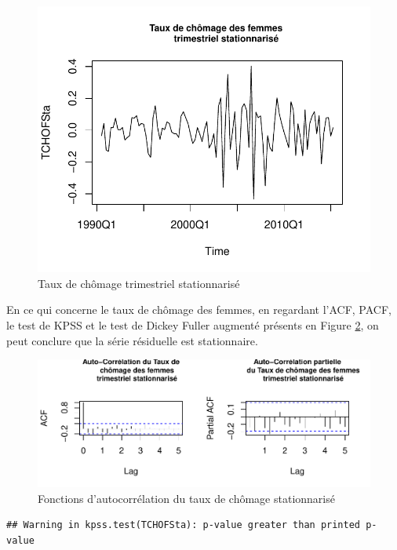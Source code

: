 \documentclass[11pt,]{article}
\begin{document}
\begin{figure}[htbp]
\centering
\includegraphics{doc_files/figure-latex/unnamed-chunk-21-1.pdf}
\caption{\label{fig17} Taux de chômage trimestriel stationnarisé}
\end{figure}

En ce qui concerne le taux de chômage des femmes, en regardant l'ACF,
PACF, le test de KPSS et le test de Dickey Fuller augmenté présents en
Figure \ref{fig18}, on peut conclure que la série résiduelle est
stationnaire.

\begin{figure}[htbp]
\centering
\includegraphics{doc_files/figure-latex/unnamed-chunk-22-1.pdf}
\caption{\label{fig18} Fonctions d'autocorrélation du taux de chômage
stationnarisé}
\end{figure}

\begin{verbatim}
## Warning in kpss.test(TCHOFSta): p-value greater than printed p-value
\end{verbatim}
\end{document}
